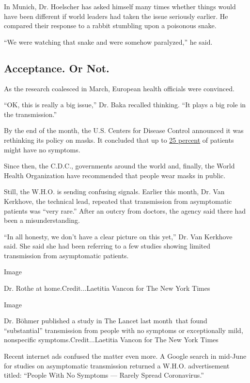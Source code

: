 In Munich, Dr. Hoelscher has asked himself many times whether things
would have been different if world leaders had taken the issue seriously
earlier. He compared their response to a rabbit stumbling upon a
poisonous snake.

``We were watching that snake and were somehow paralyzed,'' he said.

\hypertarget{acceptance-or-not}{%
\subsection{Acceptance. Or Not.}\label{acceptance-or-not}}

As the research coalesced in March, European health officials were
convinced.

``OK, this is really a big issue,'' Dr. Baka recalled thinking. ``It
plays a big role in the transmission.''

By the end of the month, the U.S. Centers for Disease Control announced
it was rethinking its policy on masks. It concluded that up to
\href{https://www.nytimes.com/2020/03/31/health/coronavirus-asymptomatic-transmission.html}{25
percent} of patients might have no symptoms.

Since then, the C.D.C., governments around the world and, finally, the
World Health Organization have recommended that people wear masks in
public.

Still, the W.H.O. is sending confusing signals. Earlier this month, Dr.
Van Kerkhove, the technical lead, repeated that transmission from
asymptomatic patients was ``very rare.'' After an outcry from doctors,
the agency said there had been a misunderstanding.

``In all honesty, we don't have a clear picture on this yet,'' Dr. Van
Kerkhove said. She said she had been referring to a few studies showing
limited transmission from asymptomatic patients.

Image

Dr. Rothe at home.Credit...Laetitia Vancon for The New York Times

Image

Dr. Böhmer published a study in The Lancet last month~that found
``substantial'' transmission from people with no symptoms or
exceptionally mild, nonspecific symptoms.Credit...Laetitia Vancon for
The New York Times

Recent internet ads confused the matter even more. A Google search in
mid-June for studies on asymptomatic transmission returned a W.H.O.
advertisement titled: ``People With No Symptoms --- Rarely Spread
Coronavirus.''

